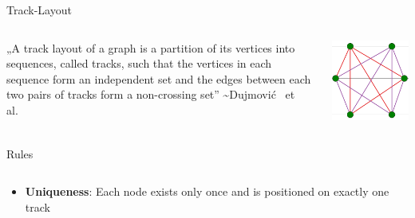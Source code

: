 \documentclass[hyperref={pdfpagelabels=false},aspectratio=169]{beamer}
\theoremstyle{definition}
\begin{document}
\begin{frame}{Track-Layout}
    \begin{columns}
        \begin{column}{0.5\textwidth}
            „A track layout of a graph is a partition of its vertices into sequences, called tracks, such that the vertices in each sequence form an independent set and the edges between each two pairs of tracks form a non-crossing set” \sim Dujmović \, et \, al.
        \end{column}
        \begin{column}{0.5\textwidth}
            \includegraphics[scale=0.7]{img/octahedron_tlp_ganz.png}
        \end{column}
    \end{columns}
\end{frame}

\begin{frame}{Rules}
\begin{columns}
    \begin{column}{0.5\textwidth}
        \begin{itemize}
            \item \textbf{Uniqueness}: Each node exists only once and is positioned on exactly one track
        \end{itemize}
    \end{column}
    \begin{column}{0.5\textwidth}
    \end{column}
\end{columns}
\end{frame}
\end{document}
